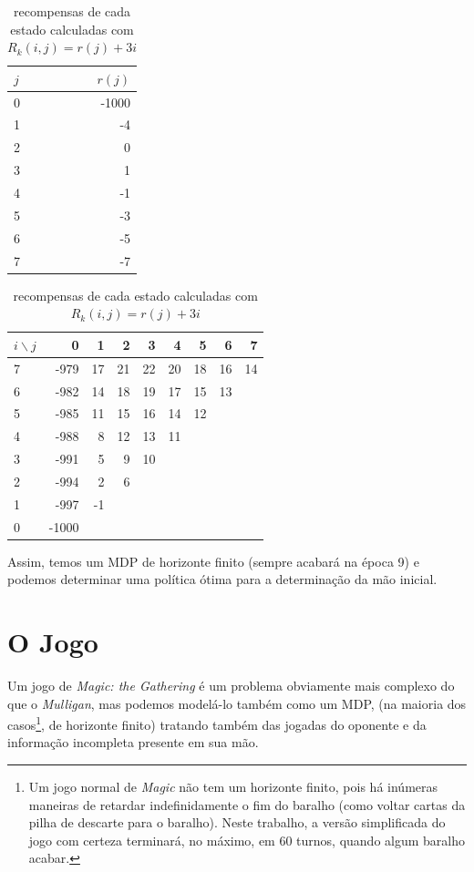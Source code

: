 \documentclass{book}
\begin{document}
\begin{table}[!h]
\parbox{.45\linewidth}{
\centering
\vspace{0.2cm}
\begin{tabular}{l|r}
$j$  & $r(j)$ \\ \hline
0 & -1000  \\
1 & -4     \\
2 & 0      \\
3 & 1      \\
4 & -1     \\
5 & -3    \\
6 & -5     \\
7 & -7
\end{tabular}
\caption{recompensas-base para $j = 0, \ldots, 7$}
\label{tab:rj}
}
\hfill
\parbox{.45\linewidth}{
\centering
\begin{tabular}{l|rrrrrrrr}
$i \backslash j$ & 0     & 1  & 2  & 3  & 4  & 5  & 6  & 7  \\ \hline
7 & -979  & 17 & 21 & 22 & 20 & 18 & 16 & 14 \\
6 & -982  & 14 & 18 & 19 & 17 & 15 & 13 &    \\
5 & -985  & 11 & 15 & 16 & 14 & 12 &    &    \\
4 & -988  & 8  & 12 & 13 & 11 &    &    &    \\
3 & -991  & 5  & 9  & 10 &    &    &    &    \\
2 & -994  & 2  & 6  &    &    &    &    &    \\
1 & -997  & -1 &    &    &    &    &    &    \\
0 & -1000 &    &    &    &    &    &    &
\end{tabular}
\caption{recompensas de cada estado calculadas com $R_k(i,j) = r(j) + 3i$}
\label{tab:Rij}
}
\end{table}
Assim, temos um MDP de horizonte finito (sempre acabará na época 9) e podemos determinar uma política ótima para a determinação da mão inicial.

\pagebreak

\section{O Jogo}

Um jogo de \textit{Magic: the Gathering} é um problema obviamente mais complexo do que o \textit{Mulligan}, mas podemos modelá-lo também como um MDP,
(na maioria dos casos\footnote{Um jogo normal de \textit{Magic} não tem um horizonte finito, pois há
inúmeras maneiras de retardar indefinidamente o fim do baralho (como voltar cartas da pilha de descarte para o baralho). Neste trabalho, a versão
simplificada do jogo com certeza terminará, no máximo, em 60 turnos, quando algum baralho acabar.}, de horizonte finito) tratando também das jogadas do oponente e da informação incompleta presente em sua mão.
\end{document}
